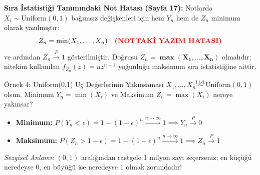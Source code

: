 \documentclass[12pt,a4paper]{article}
\begin{document}
\begin{uyari}
\textbf{Sıra İstatistiği Tanımındaki Not Hatası (Sayfa 17):}
Notlarda $X_i \sim \text{Uniform}(0, 1)$ bağımsız değişkenleri için hem $Y_n$ hem de $Z_n$ minimum olarak yazılmıştır:
\begin{equation*}
    Z_n = \min(X_1, \dots, X_n) \quad \text{\textbf{\textcolor{red}{(NOTTAKİ YAZIM HATASI)}}}
\end{equation*}
ve ardından $Z_n \xrightarrow{P} 1$ gösterilmiştir.  
Doğrusu $Z_n = \mathbf{\max(X_1, \dots, X_n)}$ olmalıdır; nitekim kullanılan $f_{Z_n}(z) = n z^{n-1}$ yoğunluğu maksimum sıra istatistiğine aittir.
\end{uyari}

\begin{ornek}{Örnek 4: Uniform(0,1) Uç Değerlerinin Yakınsaması}
$X_1, \dots, X_n \overset{\text{i.i.d.}}{\sim} \text{Uniform}(0, 1)$ olsun.  
Minimum $Y_n = \min(X_i)$ ve Maksimum $Z_n = \max(X_i)$ nereye yakınsar?
\begin{itemize}
    \item \textbf{Minimum:} $P(Y_n < \epsilon) = 1 - (1-\epsilon)^n \xrightarrow{n \to \infty} 1 \implies \boxed{Y_n \xrightarrow{P} 0}$
    \item \textbf{Maksimum:} $P(Z_n > 1 - \epsilon) = 1 - (1-\epsilon)^n \xrightarrow{n \to \infty} 1 \implies \boxed{Z_n \xrightarrow{P} 1}$
\end{itemize}
\textit{Sezgisel Anlamı:} $(0,1)$ aralığından rastgele 1 milyon sayı seçerseniz; en küçüğü neredeyse $0$, en büyüğü ise neredeyse $1$ olmak zorundadır!
\end{ornek}

\begin{center}
\end{center}
\end{document}
